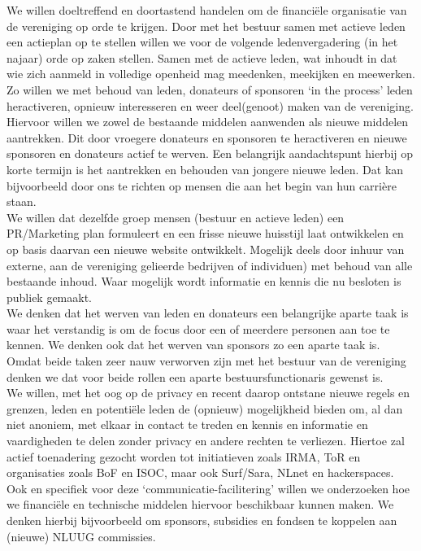 \documentclass{article}
\begin{document}
We willen doeltreffend en doortastend handelen om de financi\"ele organisatie van de vereniging op orde te krijgen. Door met het bestuur samen met actieve leden een actieplan op te stellen willen we voor de volgende ledenvergadering (in het najaar) orde op zaken stellen. Samen met de actieve leden, wat inhoudt in dat wie zich aanmeld in volledige openheid mag meedenken, meekijken en meewerken. Zo willen we met behoud van leden, donateurs of sponsoren `in the process' leden heractiveren, opnieuw interesseren en weer deel(genoot) maken van de vereniging. Hiervoor willen we zowel de bestaande middelen aanwenden als nieuwe middelen aantrekken. Dit door vroegere donateurs en sponsoren te heractiveren en nieuwe sponsoren en donateurs actief te werven. Een belangrijk aandachtspunt hierbij op korte termijn is het aantrekken en behouden van jongere nieuwe leden. Dat kan bijvoorbeeld door ons te richten op mensen die aan het begin van hun carri\`ere staan. \\

We willen dat dezelfde groep mensen (bestuur en actieve leden) een PR/Marketing plan formuleert en een frisse nieuwe huisstijl laat ontwikkelen en op basis daarvan een nieuwe website ontwikkelt. Mogelijk deels door inhuur van externe, aan de vereniging gelieerde bedrijven of individuen) met behoud van alle bestaande inhoud. Waar mogelijk wordt informatie en kennis die nu besloten is publiek gemaakt. \\

We denken dat het werven van leden en donateurs een belangrijke aparte taak is waar het verstandig is om de focus door een of meerdere personen aan toe te kennen. We denken ook dat het werven van sponsors zo een aparte taak is. Omdat beide taken zeer nauw verworven zijn met het bestuur van de vereniging denken we dat voor beide rollen een aparte bestuursfunctionaris gewenst is. \\

We willen, met het oog op de privacy en recent daarop ontstane nieuwe regels en grenzen, leden en potenti\"ele leden de (opnieuw) mogelijkheid bieden om, al dan niet anoniem, met elkaar in contact te treden en kennis en informatie en vaardigheden te delen zonder privacy en andere rechten te verliezen. Hiertoe zal actief toenadering gezocht worden tot initiatieven zoals IRMA, ToR en organisaties zoals BoF en ISOC, maar ook Surf/Sara, NLnet en hackerspaces. Ook en specifiek voor deze `communicatie-facilitering' willen we onderzoeken hoe we financi\"ele en technische middelen hiervoor beschikbaar kunnen maken. We denken hierbij bijvoorbeeld om sponsors, subsidies en fondsen te koppelen aan (nieuwe) NLUUG commissies. \\
\end{document}
